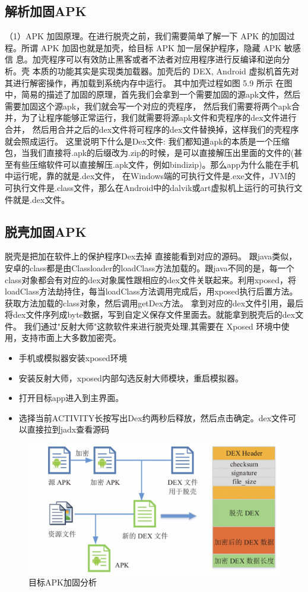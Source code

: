 \subsection{解析加固APK}
（1）APK 加固原理。在进行脱壳之前，我们需要简单了解一下 APK 的加固过
程。所谓 APK 加固也就是加壳，给目标 APK 加一层保护程序，隐藏 APK 敏感信
息。加壳程序可以有效防止黑客或者不法者对应用程序进行反编译和逆向分析。壳
本质的功能其实是实现类加载器。加壳后的 DEX, Android 虚拟机首先对其进行解密操作，再加载到系统内存中运行。
其中加壳过程如图 5.9 所示
在图中，简易的描述了加固的原理，首先我们会拿到一个需要加固的源apk文件，然后需要加固这个源apk，我们就会写一个对应的壳程序，
然后我们需要将两个apk合并，为了让程序能够正常运行，我们就需要将源apk文件和壳程序的dex文件进行合并，
然后用合并之后的dex文件将可程序的dex文件替换掉，这样我们的壳程序就会照成运行。
这里说明下什么是Dex文件:
我们都知道apk的本质是一个压缩包，当我们直接将.apk的后缀改为.zip的时候，是可以直接解压出里面的文件的(甚至有些压缩软件可以直接解压.apk文件，例如bindizip)。那么app为什么能在手机中运行呢，靠的就是.dex文件，
在Windows端的可执行文件是.exe文件，JVM的可执行文件是.class文件，那么在Android中的dalvik或art虚拟机上运行的可执行文件就是.dex文件。
\subsection{脱壳加固APK}
脱壳是把加在软件上的保护程序Dex去掉 直接能看到对应的源码。
跟java类似，安卓的class都是由Classloader的loadClass方法加载的。跟java不同的是，每一个class对象都会有对应的dex对象属性跟相应的dex文件关联起来。利用xposed，将loadClass方法劫持住，每当loadClass方法调用完成后，用xposed执行后置方法。获取方法加载的class对象，然后调用getDex方法。
拿到对应的dex文件引用，最后将dex文件序列成byte数据，写到自定义保存文件里面去。就能拿到脱壳后的dex文件。
我们通过"反射大师"这款软件来进行脱壳处理,其需要在 Xposed 环境中使用，支持市面上大多数加密壳。
\begin{itemize}
  \item 手机或模拟器安装xposed环境
  \item 安装反射大师，xposed内部勾选反射大师模块，重启模拟器。
  \item 打开目标app进入到主界面。
  \item 选择当前ACTIVITY长按写出Dex约两秒后释放，然后点击确定。dex文件可以直接拉到jadx查看源码
\end{itemize}

\begin{figure}
  \centering
  \includegraphics[scale=0.5]{resources/img/i24.png}
  \caption{目标APK加固分析}
\end{figure}

